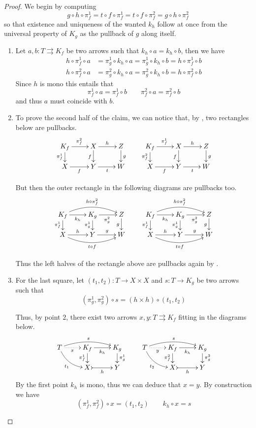 \documentclass[a4paper,UKenglish,cleveref,pdftex,thm-restate,numberwithinsect]{lipics-v2021}
\begin{document}
\kpp*
\begin{proof}\label{kpp-proof}
	We begin by computing 
	\[g \circ h \circ \pi_f^1 =  t \circ f \circ \pi_f^1     =  t \circ f \circ \pi_f^2     =  g \circ h \circ \pi_f^2\]
	so that  existence  and uniqueness of the wanted $k_h$ follow at once from the universal property of $K_g$ as the pullback of $g$ along itself.
	
	
	\begin{enumerate}
		\item Let $a,b\colon T\rightrightarrows K_f$ be two arrows such that $k_h\circ a=k_h\circ b$, then we have
\begin{align*}h\circ \pi^1_f\circ a&=\pi^1_g\circ k_h\circ a=\pi^1_g\circ k_h\circ b=h\circ \pi^1_f\circ b\\
	h\circ \pi^2_f\circ a&=\pi^2_g\circ k_h\circ a=\pi^2_g\circ k_h\circ b=h\circ \pi^2_f\circ b
\end{align*}
Since $h$ is mono this entails that
\[	\pi^1_f\circ a=\pi^1_f\circ b \qquad \pi^2_f\circ a=\pi^2_f\circ b\]
and thus $a$ must coincide with $b$.
 
 		\item  
		To prove the second half of the claim, we can notice that, by ,  two rectangles below are pullbacks.
		\[\xymatrix@R=15pt{K_f \ar[r]^{\pi^2_f} \ar[d]_{\pi^1_f} & X \ar[r]^{h} \ar[d]_{f} & Z \ar[d]^{g} &  K_f \ar[r]^{\pi^1_f} \ar[d]_{\pi^2_f} & X \ar[r]^{h} \ar[d]_{f} & Z \ar[d]^{g}\\
			X \ar[r]_{f}& Y \ar[r]_{t} & W & X \ar[r]_{f} & Y  \ar[r]_{t}& W}\]
		
		But then the outer rectangle in the  following diagrams are pullbacks too.
		\[\xymatrix@R=15pt{	K_f  \ar@/^.4cm/[rr]^{h\circ\pi^2_f}\ar[r]_{k_h} \ar[d]_{\pi^1_f}& K_g \ar[d]_{\pi^1_g}  \ar[r]_{\pi^2_g}& Z \ar[d]_{g} & K_f  \ar@/^.4cm/[rr]^{h\circ\pi^2_f}\ar[r]_{k_h} \ar[d]_{\pi^1_f}& K_g \ar[d]_{\pi^1_g}  \ar[r]_{\pi^2_g}& Z \ar[d]_{g} \\
			X \ar[r]^{h} \ar@/_.4cm/[rr]_{t\circ f}& Y \ar[r]^{g} & W & X \ar[r]^{h} \ar@/_.4cm/[rr]_{t\circ f}& Y \ar[r]^{g} & W}\]
		
		Thus the left halves of the rectangle above are pullbacks again by .   
	
		
		\item 		For the last square, let $(t_1, t_2)\colon T\to X\times X$ and $s\colon T\to K_g$ be two arrows such that
		\[(\pi^1_g, \pi^2_g)\circ s=(h\times h)\circ (t_1, t_2)\]
		
		Thus, by point $2$, there exist two arrows $x, y\colon T\rightrightarrows K_f$ fitting in the diagrams below.
		\[\xymatrix@R=15pt{T\ar@{.>}[r]_-{x} \ar@/^.3cm/[rr]^{s} \ar@/_.3cm/[dr]_{t_1}& K_f \ar@{->}[r]_{k_h} \ar[d]_{\pi^1_f} & K_g \ar[d]^{\pi^1_g} & T \ar@{.>}[r]_-{y} \ar@/^.3cm/[rr]^{s} \ar@/_.3cm/[dr]_{t_2} & K_f  \ar@{->}[r]_{k_h} \ar[d]_{\pi^2_f}& K_g \ar[d]^{\pi^2_g}\\ & X \ar@{>->}[r]_{h} & Y &&X \ar@{>->}[r]_{h}& Y} \]
		By the first point $k_h$ is mono, thus we can deduce that $x=y$. By construction we have
		\[(\pi^1_f, \pi^2_f)\circ x=(t_1, t_2) \qquad k_h\circ x=s\] 
				

\end{enumerate}
\end{proof}
\end{document}
